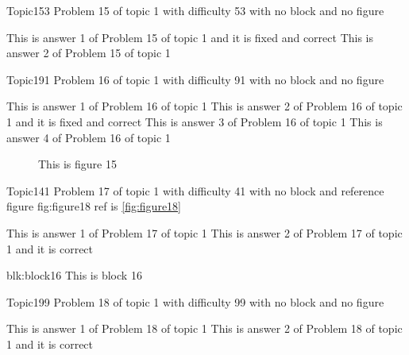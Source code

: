 \documentclass[master]{exam}
\begin{document}
\begin{problem}{Topic1}{53}
	Problem 15 of topic 1 with difficulty 53 with no block and no figure
	\begin{answers}
		 This is answer 1 of Problem 15 of topic 1 and it is fixed and correct
		\answer This is answer 2 of Problem 15 of topic 1 
	\end{answers}
\end{problem}

\begin{problem}{Topic1}{91}
	Problem 16 of topic 1 with difficulty 91 with no block and no figure
	\begin{answers}
		\answer This is answer 1 of Problem 16 of topic 1 
		 This is answer 2 of Problem 16 of topic 1 and it is fixed and correct
		\answer This is answer 3 of Problem 16 of topic 1 
		\answer This is answer 4 of Problem 16 of topic 1 
	\end{answers}
\end{problem}



\begin{figure}
	\begin{center}
		This is figure 15 
		\label{fig:figure15}
	\end{center}
\end{figure}

\begin{problem}{Topic1}{41}
	Problem 17 of topic 1 with difficulty 41 with no block and reference figure fig:figure18 ref is \ref{fig:figure18}
	\begin{answers}
		\answer This is answer 1 of Problem 17 of topic 1 
		\answer[correct] This is answer 2 of Problem 17 of topic 1 and it is correct
	\end{answers}
\end{problem}



\begin{block}{blk:block16}
This is block 16
\end{block}


\begin{problem}{Topic1}{99}
	Problem 18 of topic 1 with difficulty 99 with no block and no figure
	\begin{answers}
		\answer This is answer 1 of Problem 18 of topic 1 
		\answer[correct] This is answer 2 of Problem 18 of topic 1 and it is correct
	\end{answers}
\end{problem}
\end{document}
